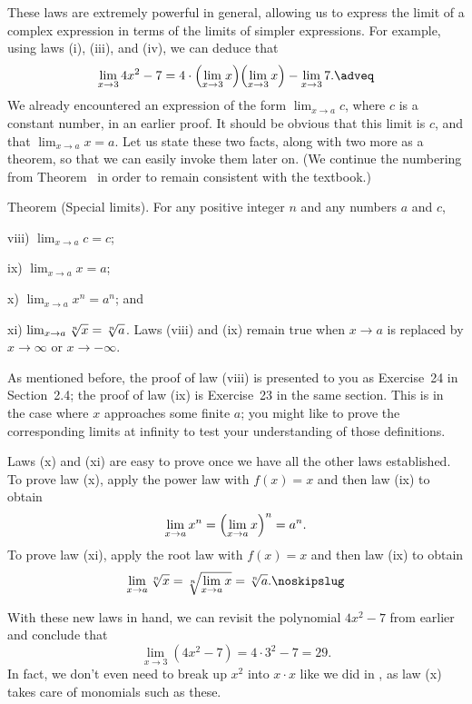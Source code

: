 These laws are extremely powerful in general, allowing us to express the limit of a complex expression
in terms of the limits of simpler expressions. For example, using laws (i), (iii), and (iv), we can deduce that
\edef\eqlimpoly{\the\eqcount}
$$\lim_{x\to 3} 4x^2-7 = 4\cdot \Bigl( \lim_{x\to 3} x\Bigr) \Bigl( \lim_{x\to 3} x\Bigr) -
\lim_{x\to 3} 7.\adveq$$
We already encountered
an expression of the form $\lim_{x\to a} c$, where $c$ is a constant number, in an earlier proof.
It should be obvious that this limit is $c$, and that $\lim_{x\to a} x = a$. Let us state these two facts,
along with two more as a theorem, so that we can easily invoke them later on. (We continue the numbering
from Theorem~{\thmalglaws} in order to remain consistent with the textbook.)

\edef\thmspeciallimits{\the\thmcount}
\parenproclaim Theorem {\advthm} (Special limits). For any positive integer $n$ and any numbers $a$ and $c$,
\medskip
\begingroup\parindent=22pt
\item{viii)} $\lim_{x\to a} c = c$;
\smallskip
\item{ix)} $\lim_{x\to a} x = a$;
\smallskip
\item{x)} $\lim_{x\to a} x^n = a^n$; and
\smallskip
\item{xi)} $\lim_{x\to a} \root n\of x = \root n\of a$.
\endgroup
\medskip
Laws (viii) and (ix) remain true when $x\to a$ is replaced by $x\to\infty$ or $x\to-\infty$.

\proof As mentioned before, the proof of law (viii) is presented to you as Exercise~24 in Section~2.4;
the proof of law (ix) is Exercise~23 in the same section. This is in the case where $x$ approaches some
finite $a$; you might like to prove the corresponding
limits at infinity to test your understanding of those definitions.

Laws (x) and (xi) are easy to prove once we have
all the other laws established.
To prove law (x), apply the power law with $f(x) = x$ and then law (ix) to obtain
$$\lim_{x\to a} x^n = \Bigl( \lim_{x\to a} x\Bigr)^n = a^n.$$
To prove law (xi), apply the root law with $f(x) = x$ and then law (ix) to obtain
$$\lim_{x\to a} \root n\of x = \root n\of{ \lim_{x\to a} x} = \root n\of a.\noskipslug$$

With these new laws in hand, we can revisit the polynomial $4x^2-7$ from earlier and conclude that
$$\lim_{x\to 3} (4x^2 - 7) = 4\cdot 3^2 - 7 = 29.$$
In fact, we don't even need to break up $x^2$ into $x\cdot x$ like we did
in \refeq{\eqlimpoly}, as law (x) takes care of monomials
such as these.

